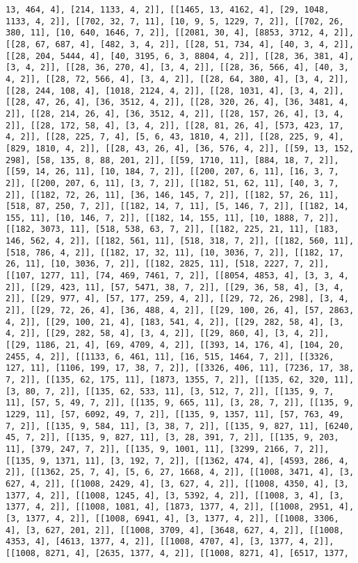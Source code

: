 \documentclass[12pt,fleqn]{article}\usepackage{../../common}
\begin{document}
\begin{verbatim}
13, 464, 4], [214, 1133, 4, 2]], [[1465, 13, 4162, 4], [29, 1048, 1133, 4, 2]], [[702, 32, 7, 11], [10, 9, 5, 1229, 7, 2]], [[702, 26, 380, 11], [10, 640, 1646, 7, 2]], [[2081, 30, 4], [8853, 3712, 4, 2]], [[28, 67, 687, 4], [482, 3, 4, 2]], [[28, 51, 734, 4], [40, 3, 4, 2]], [[28, 204, 5444, 4], [40, 3195, 6, 3, 8804, 4, 2]], [[28, 36, 381, 4], [3, 4, 2]], [[28, 36, 270, 4], [3, 4, 2]], [[28, 36, 566, 4], [40, 3, 4, 2]], [[28, 72, 566, 4], [3, 4, 2]], [[28, 64, 380, 4], [3, 4, 2]], [[28, 244, 108, 4], [1018, 2124, 4, 2]], [[28, 1031, 4], [3, 4, 2]], [[28, 47, 26, 4], [36, 3512, 4, 2]], [[28, 320, 26, 4], [36, 3481, 4, 2]], [[28, 214, 26, 4], [36, 3512, 4, 2]], [[28, 157, 26, 4], [3, 4, 2]], [[28, 172, 58, 4], [3, 4, 2]], [[28, 81, 26, 4], [573, 423, 17, 4, 2]], [[28, 225, 7, 4], [5, 6, 43, 1810, 4, 2]], [[28, 225, 9, 4], [829, 1810, 4, 2]], [[28, 43, 26, 4], [36, 576, 4, 2]], [[59, 13, 152, 298], [58, 135, 8, 88, 201, 2]], [[59, 1710, 11], [884, 18, 7, 2]], [[59, 14, 26, 11], [10, 184, 7, 2]], [[200, 207, 6, 11], [16, 3, 7, 2]], [[200, 207, 6, 11], [3, 7, 2]], [[182, 51, 62, 11], [40, 3, 7, 2]], [[182, 72, 26, 11], [36, 146, 145, 7, 2]], [[182, 57, 26, 11], [518, 87, 250, 7, 2]], [[182, 14, 7, 11], [5, 146, 7, 2]], [[182, 14, 155, 11], [10, 146, 7, 2]], [[182, 14, 155, 11], [10, 1888, 7, 2]], [[182, 3073, 11], [518, 538, 63, 7, 2]], [[182, 225, 21, 11], [183, 146, 562, 4, 2]], [[182, 561, 11], [518, 318, 7, 2]], [[182, 560, 11], [518, 786, 4, 2]], [[182, 17, 32, 11], [10, 3036, 7, 2]], [[182, 17, 26, 11], [10, 3036, 7, 2]], [[182, 2825, 11], [518, 2227, 7, 2]], [[107, 1277, 11], [74, 469, 7461, 7, 2]], [[8054, 4853, 4], [3, 3, 4, 2]], [[29, 423, 11], [57, 5471, 38, 7, 2]], [[29, 36, 58, 4], [3, 4, 2]], [[29, 977, 4], [57, 177, 259, 4, 2]], [[29, 72, 26, 298], [3, 4, 2]], [[29, 72, 26, 4], [36, 488, 4, 2]], [[29, 100, 26, 4], [57, 2863, 4, 2]], [[29, 100, 21, 4], [183, 541, 4, 2]], [[29, 282, 58, 4], [3, 4, 2]], [[29, 282, 58, 4], [3, 4, 2]], [[29, 860, 4], [3, 4, 2]], [[29, 1186, 21, 4], [69, 4709, 4, 2]], [[393, 14, 176, 4], [104, 20, 2455, 4, 2]], [[1133, 6, 461, 11], [16, 515, 1464, 7, 2]], [[3326, 127, 11], [1106, 199, 17, 38, 7, 2]], [[3326, 406, 11], [7236, 17, 38, 7, 2]], [[135, 62, 175, 11], [1873, 1355, 7, 2]], [[135, 62, 320, 11], [3, 80, 7, 2]], [[135, 62, 533, 11], [3, 512, 7, 2]], [[135, 9, 7, 11], [57, 5, 49, 7, 2]], [[135, 9, 665, 11], [3, 28, 7, 2]], [[135, 9, 1229, 11], [57, 6092, 49, 7, 2]], [[135, 9, 1357, 11], [57, 763, 49, 7, 2]], [[135, 9, 584, 11], [3, 38, 7, 2]], [[135, 9, 827, 11], [6240, 45, 7, 2]], [[135, 9, 827, 11], [3, 28, 391, 7, 2]], [[135, 9, 203, 11], [379, 247, 7, 2]], [[135, 9, 1001, 11], [3299, 2166, 7, 2]], [[135, 9, 1371, 11], [3, 192, 7, 2]], [[1362, 474, 4], [4593, 286, 4, 2]], [[1362, 25, 7, 4], [5, 6, 27, 1668, 4, 2]], [[1008, 3471, 4], [3, 627, 4, 2]], [[1008, 2429, 4], [3, 627, 4, 2]], [[1008, 4350, 4], [3, 1377, 4, 2]], [[1008, 1245, 4], [3, 5392, 4, 2]], [[1008, 3, 4], [3, 1377, 4, 2]], [[1008, 1081, 4], [1873, 1377, 4, 2]], [[1008, 2951, 4], [3, 1377, 4, 2]], [[1008, 6941, 4], [3, 1377, 4, 2]], [[1008, 3306, 4], [3, 627, 201, 2]], [[1008, 3709, 4], [3648, 627, 4, 2]], [[1008, 4353, 4], [4613, 1377, 4, 2]], [[1008, 4707, 4], [3, 1377, 4, 2]], [[1008, 8271, 4], [2635, 1377, 4, 2]], [[1008, 8271, 4], [6517, 1377, 
\end{verbatim}
\end{document}
